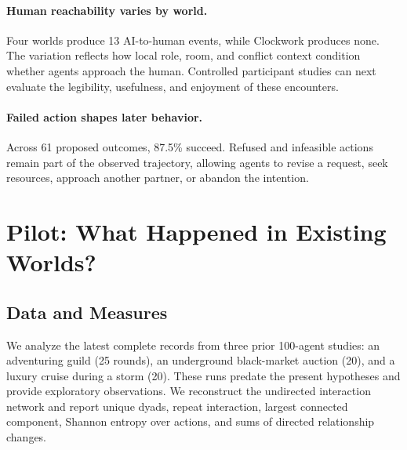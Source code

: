 \documentclass[10pt,twocolumn]{article}
\begin{document}
\paragraph{Human reachability varies by world.}
Four worlds produce 13 AI-to-human events, while Clockwork produces none. The
variation reflects how local role, room, and conflict context condition whether
agents approach the human. Controlled participant studies can next evaluate the
legibility, usefulness, and enjoyment of these encounters.

\paragraph{Failed action shapes later behavior.}
Across 61 proposed outcomes, 87.5\% succeed. Refused and infeasible actions
remain part of the observed trajectory, allowing agents to revise a request,
seek resources, approach another partner, or abandon the intention.

\section{Pilot: What Happened in Existing Worlds?}

\subsection{Data and Measures}

We analyze the latest complete records from three prior 100-agent studies: an
adventuring guild (25 rounds), an underground black-market auction (20), and a
luxury cruise during a storm (20). These runs predate the present hypotheses
and provide exploratory observations. We reconstruct the undirected interaction
network and report unique dyads, repeat interaction, largest connected
component, Shannon entropy over actions, and sums of directed relationship
changes.

\begin{table}[t]
\centering
\small
{}
\caption{Descriptive pilot statistics from 1,052 previously completed agent
interactions. ``Repeat'' is the fraction of events beyond the first event for
an unordered dyad. Relationship values are sums of directed changes within the
simulated worlds.}
\label{tab:pilot}
\end{table}
\end{document}
